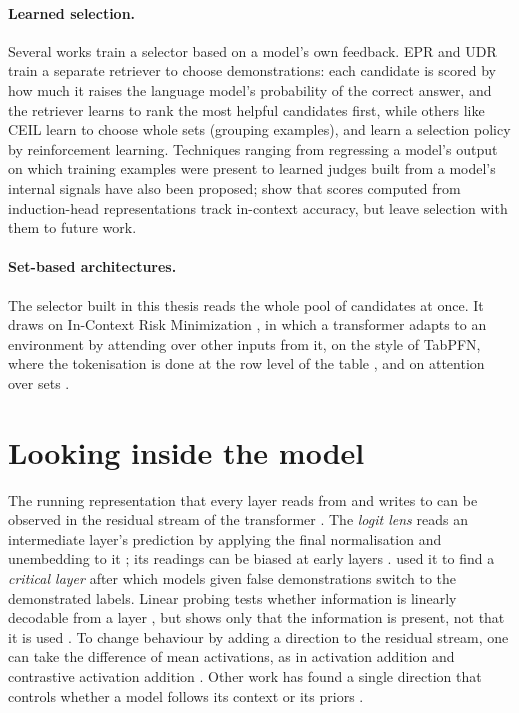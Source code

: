 \newpage
\paragraph{Learned selection.}
Several works train a selector based on a model's own feedback. EPR \citep{rubin2022learning} and UDR \citep{li2023unified} train a separate retriever to choose demonstrations: each candidate is scored by how much it raises the language model's probability of the correct answer, and the retriever learns to rank the most helpful candidates first, while others like CEIL \citep{ye2023compositional} learn to choose whole sets (grouping examples), and \citet{zhang2022active} learn a selection policy by reinforcement learning. Techniques ranging from regressing a model's output on which training examples were present \citep{ilyas2022datamodels} to learned judges built from a model's internal signals \citep{kato2025affinity, wang2026disp} have also been proposed; \citet{kato2025affinity} show that scores computed from induction-head representations track in-context accuracy, but leave selection with them to future work.

\paragraph{Set-based architectures.}
The selector built in this thesis reads the whole pool of candidates at once.
It draws on In-Context Risk Minimization \citep{gupta2024context}, in which a transformer adapts to an environment by attending over other inputs from it, on the style of TabPFN, where the tokenisation is done at the row level of the table \citep{hollmann2023tabpfn}, and on attention over sets \citep{lee2019set}.

\section{Looking inside the model}
\label{sec:bg-mech}
The running representation that every layer reads from and writes to can be observed in the residual stream of the transformer \citep{vaswani2017attention, elhage2021mathematical}. The \emph{logit lens} reads an intermediate layer's prediction by applying the final normalisation and unembedding to it \citep{nostalgebraist2020logit}; its readings can be biased at early layers \citep{belrose2023eliciting}.
\citet{halawi2024overthinking} used it to find a \emph{critical layer} after which models given false demonstrations switch to the demonstrated labels. Linear probing tests whether information is linearly decodable from a layer \citep{alain2017understanding}, but shows only that the information is present, not that it is used \citep{belinkov2022probing}. To change behaviour by adding a direction to the residual stream, one can take the difference of mean activations, as in activation addition \citep{turner2023activation} and contrastive activation addition \citep{rimsky2024steering}. Other work has found a single direction that controls whether a model follows its context or its priors \citep{minder2025controllable}.

